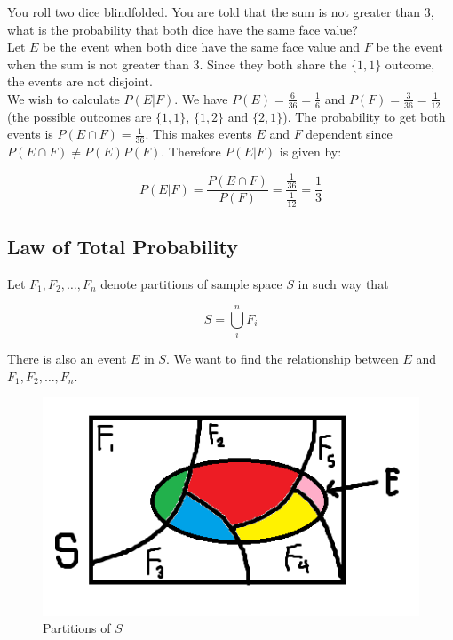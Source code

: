\documentclass[12pt, a4paper]{article}
\newcounter{exa}
\begin{document}
\begin{texample}
You roll two dice blindfolded. You are told that the sum is not greater than $3$, what is the probability that both dice have the same face value? \\

Let $E$ be the event when both dice have the same face value and $F$ be the event when the sum is not greater than $3$. Since they both share the $\{1, 1\}$ outcome, the events are not disjoint. \\

We wish to calculate $P(E|F)$. We have $P(E)=\frac{6}{36}=\frac16$ and $P(F)=\frac{3}{36}=\frac{1}{12}$ (the possible outcomes are $\{1, 1\}$, $\{1, 2\}$ and $\{2, 1\}$). The probability to get both events is $P(E \cap F)=\frac{1}{36}$. This makes events $E$ and $F$ dependent since $P(E \cap F) \ne P(E)P(F)$. Therefore $P(E|F)$ is given by:

$$P(E|F)=\frac{P(E \cap F)}{P(F)}=\frac{\frac{1}{36}}{\frac{1}{12}}=\frac{1}{3}$$
\end{texample}

\subsection{Law of Total Probability}

Let $F_1, F_2, \dots, F_n$ denote partitions of sample space $S$ in such way that

$$S=\bigcup_i^n F_i$$

There is also an event $E$ in $S$. We want to find the relationship between $E$ and $F_1, F_2, \dots, F_n$.

\begin{figure}[H]
\centering
\includegraphics[width=130mm]{2.png}
\caption{Partitions of $S$}
\end{figure}
\end{document}
